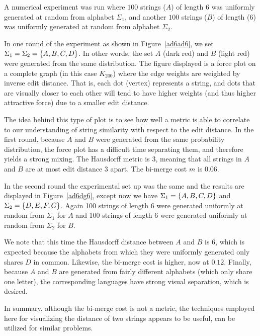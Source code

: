 A numerical experiment was run
where \(100\) strings (\(A\)) of length \(6\) was
uniformly generated at random from alphabet \(\Sigma_1\),
and another \(100\) strings (\(B\)) of length (6) was uniformly generated
at random from alphabet \(\Sigma_2\).

In one round of the experiment as shown in Figure~\ref{ad6ad6},
we set \(\Sigma_1 = \Sigma_2 = \left\{A, B, C, D\right\}\).
In other words,
the set \(A\) (dark red) and \(B\) (light red)
were generated from the same distribution.
The figure displayed is a force plot on a complete graph
(in this case \(K_{200}\))
where the edge weights are weighted by inverse edit distance.
That is, each dot (vertex) represents a string,
and dots that are visually closer to each other will tend to have higher
weights (and thus higher attractive force) due to a smaller edit distance.

The idea behind this type of plot is to see how well a metric is able to
correlate to our understanding of string similarity with respect to
the edit distance.
In the first round, because \(A\) and \(B\) were generated from the same
probability distribution, the force plot has a difficult time separating them,
and therefore yields a strong mixing.
The Hausdorff metric is \(3\), meaning that all strings in \(A\) and \(B\)
are at most edit distance \(3\) apart.
The bi-merge cost \(m\) is 0.06.

In the second round the experimental set up was the same and
the results are displayed in Figure~\ref{ad6dg6},
except now we have
\(\Sigma_1 = \left\{A, B, C, D\right\}\) and
\(\Sigma_2 = \left\{D, E, F, G\right\}\).
Again 100 strings of length \(6\) were generated
uniformly at random from \(\Sigma_1\) for \(A\)
and 100 strings of length \(6\) were generated
uniformly at random from \(\Sigma_2\) for \(B\).

We note that this time the Hausdorff distance between \(A\) and \(B\)
is \(6\),
which is expected because the alphabets from which they were uniformly
generated only shares \(D\) in common.
Likewise, the bi-merge cost is higher, now at \(0.12\).
Finally, because \(A\) and \(B\) are generated from fairly different
alphabets (which only share one letter),
the corresponding languages have strong visual separation,
which is desired.


In summary, although the bi-merge cost is not a metric,
the techniques employed here for visualizing the distance of two strings
appears to be useful,
can be utilized for similar problems.


